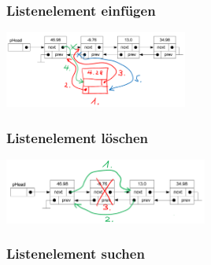 \begin{multicols}{2}
\subsubsection{Listenelement einfügen}
\begin{flushleft}
{\includegraphics[width=0.45\textwidth]{images/Listen/DLL_Insert.png}}
\label{Fig: Element bei DLL einf"ugen}
\end{flushleft}


\vfill\null
\columnbreak

\subsubsection{Listenelement löschen}
\begin{flushleft}
{\includegraphics[width=0.5\textwidth]{images/Listen/DLL_Delete.png}}
\label{Fig: Element bei DLL l"oschen}
\end{flushleft}

\end{multicols}

\subsubsection{Listenelement suchen}

